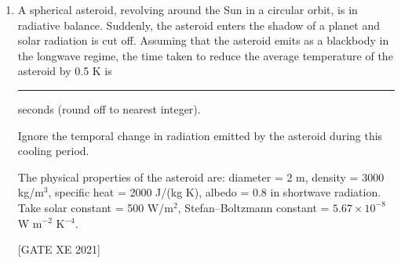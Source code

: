 \documentclass[journal,12pt,onecolumn]{IEEEtran}
\theoremstyle{remark}
\begin{document}
\begin{enumerate}[resume]
\hfill[GATE XE 2021]


\item A spherical asteroid, revolving around the Sun in a circular orbit, is in radiative balance. Suddenly, the asteroid enters the shadow of a planet and solar radiation is cut off. Assuming that the asteroid emits as a blackbody in the longwave regime, the time taken to reduce the average temperature of the asteroid by 0.5 K is \rule{3cm}{0.15mm} seconds (round off to nearest integer).  

Ignore the temporal change in radiation emitted by the asteroid during this cooling period.  

The physical properties of the asteroid are: diameter = 2 m, density = 3000 kg/m$^3$, specific heat = 2000 J/(kg K), albedo = 0.8 in shortwave radiation. Take solar constant = 500 W/m$^2$, Stefan–Boltzmann constant = $5.67 \times 10^{-8}$ W m$^{-2}$ K$^{-4}$.

\hfill[GATE XE 2021]

\end{enumerate}
\end{document}
